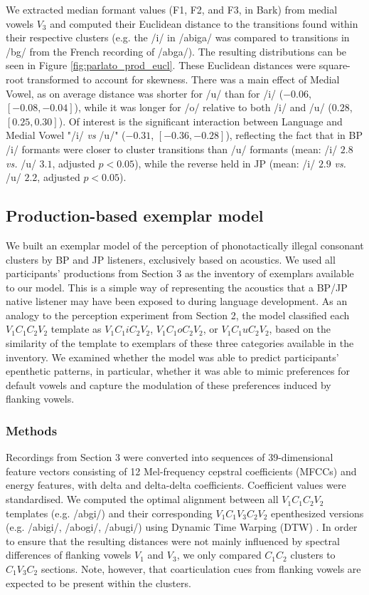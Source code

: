 We extracted median formant values (F1, F2, and F3, in Bark) from medial vowels $V_{3}$ and computed their Euclidean distance to the transitions found within their respective clusters (e.g. the /i/ in /abiga/ was compared to transitions in /bg/ from the French recording of /abga/). {\color{blue}The resulting distributions can be seen in Figure \ref{fig:parlato_prod_eucl}.} These Euclidean distances were square-root transformed to account for skewness. There was a main effect of Medial Vowel, as on average distance was shorter for /u/ than for /i/ ($-0.06$, $[-0.08, -0.04]$), while it was longer for /o/ relative to both /i/ and /u/ ($0.28$, $[0.25, 0.30]$). Of interest is the significant interaction between Language and Medial Vowel "/i/ \textit{vs} /u/" ($-0.31$, $[-0.36, -0.28]$), reflecting the fact that in BP /i/ formants were closer to cluster transitions than /u/ formants (mean: /i/ $2.8$ \textit{vs.} /u/ $3.1$, adjusted $p<0.05$), while the reverse held in JP (mean: /i/ $2.9$ \textit{vs.} /u/ $2.2$, adjusted $p<0.05$). 

\subsection{Production-based exemplar model}

We built an exemplar model of the perception of phonotactically illegal consonant clusters by BP and JP listeners, exclusively based on acoustics. We used all participants' productions from Section 3 as the inventory of exemplars available to our model. This is a simple way of representing the acoustics that a BP/JP native listener may have been exposed to during language development. As an analogy to the perception experiment from Section 2, the model classified each $V_{1}C_{1}C_{2}V_{2}$ template as $V_{1}C_{1}iC_{2}V_{2}$, $V_{1}C_{1}oC_{2}V_{2}$, or $V_{1}C_{1}uC_{2}V_{2}$, based on the similarity of the template to exemplars of these three categories available in the inventory. We examined whether the model was able to predict participants' epenthetic patterns, in particular, whether it was able to mimic preferences for default vowels and capture the modulation of these preferences induced by flanking vowels.   

\subsubsection{Methods}
Recordings from Section 3 were converted into sequences of 39-dimensional feature vectors consisting of 12 Mel-frequency cepstral coefficients (MFCCs) and energy features, with delta and delta-delta coefficients. Coefficient values were standardised. We computed the optimal alignment between all $V_{1}C_{1}C_{2}V_{2}$ templates (e.g. /abgi/) and their corresponding $V_{1}C_{1}V_{3}C_{2}V_{2}$ epenthesized versions (e.g. /abigi/, /abogi/, /abugi/) using Dynamic Time Warping (DTW) \cite{sakoe1978, R-dtw}. In order to ensure that the resulting distances were not mainly influenced by spectral differences of flanking vowels $V_{1}$ and $V_{3}$, we only compared $C_{1}C_{2}$ clusters to $C_{1}V_{3}C_{2}$ sections. Note, however, that coarticulation cues from flanking vowels are expected to be present within the clusters. 

